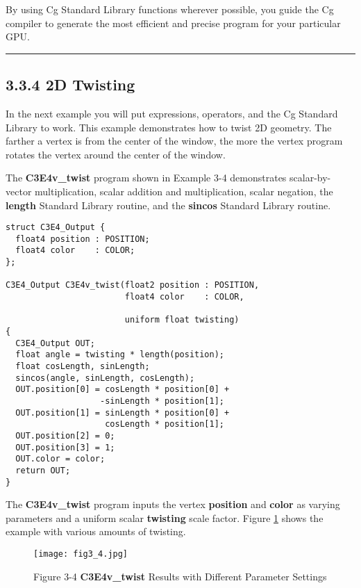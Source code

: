 \documentclass[../main.tex]{subfiles}
\begin{document}
By using Cg Standard Library functions wherever possible, you guide the Cg compiler to generate the most efficient and precise program for your particular GPU.
\hrule

\subsection{3.3.4 2D Twisting}

In the next example you will put expressions, operators, and the Cg Standard Library to work. This example demonstrates how to twist 2D geometry. The farther a vertex is from the center of the window, the more the vertex program rotates the vertex around the center of the window.

The \textbf{C3E4v_twist} program shown in Example 3-4 demonstrates scalar-by-vector multiplication, scalar addition and multiplication, scalar negation, the \textbf{length} Standard Library routine, and the \textbf{sincos} Standard Library routine.

\FloatBarrier
\begin{lstlisting}[caption=Example 3-4. The \textbf{C3E4v_twist} Vertex Program]
struct C3E4_Output {
  float4 position : POSITION;
  float4 color    : COLOR;
};

C3E4_Output C3E4v_twist(float2 position : POSITION,
                        float4 color    : COLOR,

                        uniform float twisting)
{
  C3E4_Output OUT;
  float angle = twisting * length(position);
  float cosLength, sinLength;
  sincos(angle, sinLength, cosLength);
  OUT.position[0] = cosLength * position[0] +
                   -sinLength * position[1];
  OUT.position[1] = sinLength * position[0] +
                    cosLength * position[1];
  OUT.position[2] = 0;
  OUT.position[3] = 1;
  OUT.color = color;
  return OUT;
}
\end{lstlisting}
\FloatBarrier

The \textbf{C3E4v_twist} program inputs the vertex \textbf{position} and \textbf{color} as varying parameters and a uniform scalar \textbf{twisting} scale factor. Figure \ref{fig:3-4} shows the example with various amounts of twisting.

\begin{figure}
    \centering
    \texttt{[image: fig3\_4.jpg]}
    \caption{Figure 3-4 \textbf{C3E4v_twist} Results with Different Parameter Settings}
    \label{fig:3-4}
\end{figure}
\end{document}

